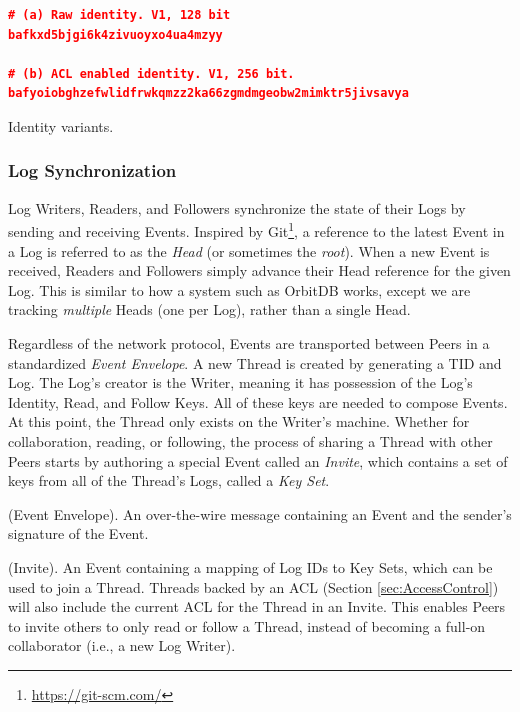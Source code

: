 \documentclass{textile}
\begin{document}
\begin{example}[hb]
\centering
\begin{minipage}{0.6\textwidth}
\begin{lstlisting}[language=json,firstnumber=1]
# (a) Raw identity. V1, 128 bit
bafkxd5bjgi6k4zivuoyxo4ua4mzyy

# (b) ACL enabled identity. V1, 256 bit.
bafyoiobghzefwlidfrwkqmzz2ka66zgmdmgeobw2mimktr5jivsavya
\end{lstlisting}
\end{minipage}
  \caption{Identity variants.}
  \label{ex:Identity}
\end{example}

\subsubsection{Log Synchronization}\label{sec:LogSync}

Log Writers, Readers, and Followers synchronize the state of their Logs by sending and receiving Events. Inspired by Git\footnote{\url{https://git-scm.com/}}, a reference to the latest Event in a Log is referred to as the \emph{Head} (or sometimes the \emph{root}). When a new Event is received, Readers and Followers simply advance their Head reference for the given Log. This is similar to how a system such as OrbitDB \cite{markroberthendersonOrbitDBFieldManual2019} works, except we are tracking \emph{multiple} Heads (one per Log), rather than a single Head.

Regardless of the network protocol, Events are transported between Peers in a standardized \emph{Event Envelope}. A new Thread is created by generating a TID and Log. The Log's creator is the Writer, meaning it has possession of the Log's Identity, Read, and Follow Keys. All of these keys are needed to compose Events. At this point, the Thread only exists on the Writer's machine. Whether for collaboration, reading, or following, the process of sharing a Thread with other Peers starts by authoring a special Event called an \emph{Invite}, which contains a set of keys from all of the Thread's Logs, called a \emph{Key Set}.

\begin{definition}
  (Event Envelope). An over-the-wire message containing an Event and the sender's signature of the Event.
\end{definition}

\begin{definition}
  (Invite). An Event containing a mapping of Log IDs to Key Sets, which can be used to join a Thread. Threads backed by an ACL (Section  \ref{sec:AccessControl}) will also include the current ACL for the Thread in an Invite. This enables Peers to invite others to only read or follow a Thread, instead of becoming a full-on collaborator (i.e., a new Log Writer).
\end{definition}
\end{document}
